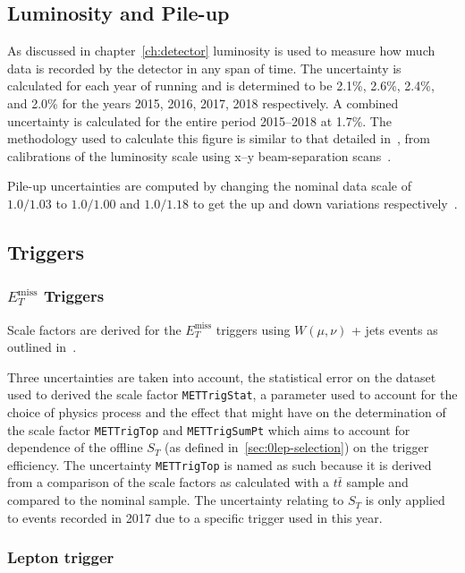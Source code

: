 \subsection{Luminosity and Pile-up}
\label{sec:lumisys}

As discussed in chapter~\ref{ch:detector} luminosity is used to measure how much
data is recorded by the detector in any span of time. The uncertainty is
calculated for each year of running and is determined to be  2.1\%, 2.6\%,
2.4\%, and 2.0\% for the years 2015, 2016, 2017, 2018 respectively. A combined
uncertainty is calculated for the entire period 2015--2018 at 1.7\%. The
methodology used to calculate this figure is similar to that detailed
in~\cite{lumiDetermine}, from calibrations of the luminosity scale using x--y
beam-separation scans~\cite{lumiTwiki}.

Pile-up uncertainties are computed by changing the nominal data scale of
$1.0/1.03$ to $1.0/1.00$ and $1.0/1.18$ to get the up and down variations
respectively~\cite{puTWiki}.

\subsection{Triggers}
\label{sec:trigsys}

\subsubsection{\texorpdfstring{$E_T^{\text{miss}}$}{MET} Triggers}

Scale factors are derived for the $E_T^{\text{miss}}$ triggers using
$W(\mu,\nu)$ + jets events as outlined in~\cite{VHObjectNote2019}.

Three uncertainties are taken into account, the statistical error on the dataset
used to derived the scale factor \texttt{METTrigStat}, a parameter used to
account for the choice of physics process and the effect that might have on the
determination of the scale factor \texttt{METTrigTop} and \texttt{METTrigSumPt}
which aims to account for dependence of the offline $S_T$ (as defined
in~\ref{sec:0lep-selection}) on the trigger efficiency. The uncertainty
\texttt{METTrigTop} is named as such because it is derived from a comparison of
the scale factors as calculated with a $t\bar{t}$ sample and compared to the
nominal sample. The uncertainty relating to $S_T$ is only applied to events
recorded in 2017 due to a specific trigger used in this year.

\subsubsection{Lepton trigger}

